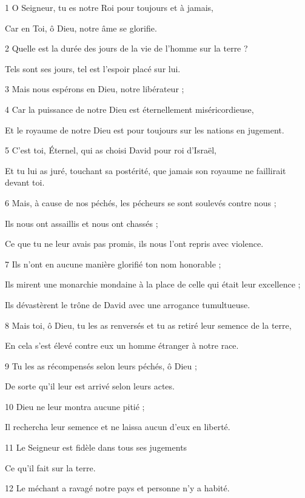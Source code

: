 \par 1 O Seigneur, tu es notre Roi pour toujours et à jamais,
\par     Car en Toi, ô Dieu, notre âme se glorifie.
\par 2 Quelle est la durée des jours de la vie de l'homme sur la terre ?
\par     Tels sont ses jours, tel est l’espoir placé sur lui.
\par 3 Mais nous espérons en Dieu, notre libérateur ;
\par 4 Car la puissance de notre Dieu est éternellement miséricordieuse,
\par     Et le royaume de notre Dieu est pour toujours sur les nations en jugement.
\par   
\par 5 C'est toi, Éternel, qui as choisi David pour roi d'Israël,
\par     Et tu lui as juré, touchant sa postérité, que jamais son royaume ne faillirait devant toi.
\par 6 Mais, à cause de nos péchés, les pécheurs se sont soulevés contre nous ;
\par     Ils nous ont assaillis et nous ont chassés ;
\par     Ce que tu ne leur avais pas promis, ils nous l'ont repris avec violence.
\par 7 Ils n'ont en aucune manière glorifié ton nom honorable ;
\par     Ils mirent une monarchie mondaine à la place de celle qui était leur excellence ;
\par     Ils dévastèrent le trône de David avec une arrogance tumultueuse.
\par 8 Mais toi, ô Dieu, tu les as renversés et tu as retiré leur semence de la terre,
\par     En cela s’est élevé contre eux un homme étranger à notre race.
\par 9 Tu les as récompensés selon leurs péchés, ô Dieu ;
\par     De sorte qu'il leur est arrivé selon leurs actes.
\par 10 Dieu ne leur montra aucune pitié ;
\par     Il rechercha leur semence et ne laissa aucun d'eux en liberté.
\par 11 Le Seigneur est fidèle dans tous ses jugements
\par     Ce qu'il fait sur la terre.
\par   
\par 12 Le méchant a ravagé notre pays et personne n'y a habité.
